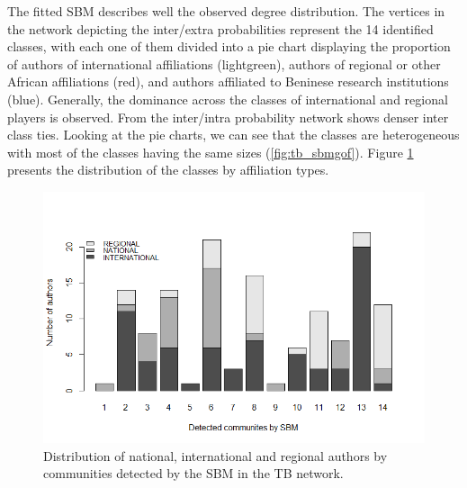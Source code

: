 The fitted SBM describes well the observed degree distribution. The vertices in the network depicting the inter/extra probabilities represent the 14 identified classes, with each one of them divided into a pie chart displaying the proportion of authors of international affiliations (lightgreen), authors of regional or other African affiliations (red), and authors affiliated to Beninese research institutions (blue). Generally, the dominance across the classes of international and regional players is observed. From the inter/intra probability network shows denser inter class ties. Looking at the pie charts, we can see that the classes are heterogeneous with most of the classes having the same sizes (\ref{fig:tb_sbmgof}). Figure \ref{fig:tb_sbmdist} presents the distribution of the classes by affiliation types. \\

\begin{figure}[h!]
\centering
\includegraphics[scale=0.8]{Chapters/tb/statMod/tb_barplot2}
\caption{Distribution of national, international and regional authors by communities detected by the SBM in the TB network.}
\label{fig:tb_sbmdist}
\end{figure}

%

